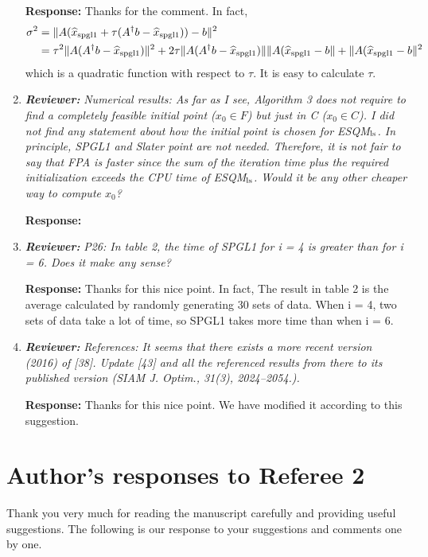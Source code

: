 \documentclass{article}
\begin{document}
\begin{enumerate}
	\textbf{Response:} Thanks for the comment. In fact, 
\begin{equation*}
\begin{aligned}
\sigma^2 &= \|A(\widehat x_{\rm spgl1} + \tau(A^\dagger b - \widehat x_{\rm spgl1})) - b\|^2\\
 &=\tau^2\|A(A^\dagger b - \widehat x_{\rm spgl1})\|^2 + 2\tau\|A(A^\dagger b - \widehat x_{\rm spgl1})\|\|A(\widehat x_{\rm spgl1} - b\| + \|A(\widehat x_{\rm spgl1} - b\|^2
\end{aligned}
\end{equation*}
which is a quadratic function with respect to $\tau$. It is easy to calculate $\tau$.


	\item  \textit{\textbf{Reviewer:}} \textit{Numerical results: As far as I see, Algorithm 3 does not require to find a completely feasible initial point ($x_0\in F$) but just in C ($x_0\in C$). I did not find any statement about how the initial point is chosen for ESQM$_{\rm ls}$. In principle, SPGL1 and Slater point are not needed. Therefore, it is not fair to say that FPA is faster since the sum of the iteration time plus the required initialization exceeds the CPU time of ESQM$_{\rm ls}$. Would it be any other cheaper way to compute $x_0$?}
	
	\textbf{Response:} {\color{red}{Unanswered.}}

    \item  \textit{\textbf{Reviewer:}} \textit{P26: In table 2, the time of SPGL1 for i = 4 is greater than for i = 6. Does it make any sense?}
	
	\textbf{Response:} Thanks for this nice point. In fact, The result in table 2 is the average calculated by randomly generating 30 sets of data. When i = 4, two sets of data take a lot of time, so SPGL1 takes more time than when i = 6.

    \item  \textit{\textbf{Reviewer:}} \textit{References: It seems that there exists a more recent version (2016) of [38]. Update [43] and all the referenced results from there to its published version (SIAM J. Optim., 31(3), 2024--2054.).}
	
	\textbf{Response:} Thanks for this nice point. We have modified it according to this suggestion.






\end{enumerate}


\section*{Author's responses to Referee 2}
Thank you very much for reading the manuscript carefully and providing useful suggestions. The following is our response to your suggestions and comments one by one.
\end{document}

